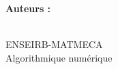 \documentclass[a4paper,12pt]{article}
\title{\texteTitre}
\author{\texteAuteurs}
\date{\texteDate}
\begin{document}


\hypersetup{pageanchor=false}
\begin{titlepage}
    \centering

    \vspace*{1.5cm}

    {\Huge\bfseries \texteNumero\par}

    \vspace{0.8cm}

    {\LARGE \texteTitre \par}

    \vspace{7cm}

    {\Large
    \textbf{Auteurs :}\\
    \texteAuteurs\par}

    \vfill

    {\large
    \texteDate\\
    ENSEIRB-MATMECA\\
    Algorithmique numérique
    \par}

    \vspace{1cm}

\end{titlepage}
\hypersetup{pageanchor=true} %


\tableofcontents
\newpage


\section{}

\section{}

\section{}


\section*{}

\end{document}
